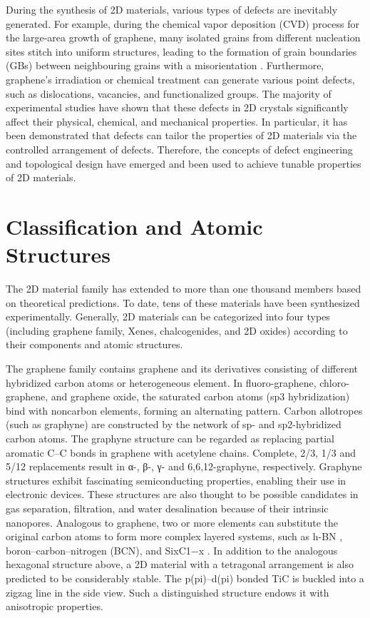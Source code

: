 \documentclass[12pt,a4paper]{report}
\begin{document}
During the synthesis of 2D materials, various types of defects are inevitably generated. For example, during the chemical vapor deposition (CVD) process for the large-area growth of graphene, many isolated grains from different nucleation sites stitch into uniform structures, leading to the formation of grain boundaries (GBs) between neighbouring grains with a misorientation . Furthermore, graphene’s irradiation or chemical treatment can generate various point defects, such as dislocations, vacancies, and functionalized groups. The majority of experimental studies have shown that these defects in 2D crystals significantly affect their physical, chemical, and mechanical properties. In particular, it has been demonstrated that defects can tailor the properties of 2D materials via the controlled arrangement of defects. Therefore, the concepts of defect engineering and topological design have emerged and been used to achieve tunable properties of 2D materials.



\section{Classification and Atomic Structures}

The 2D material family has extended to more than one thousand members based on theoretical predictions. To date, tens of these materials have been synthesized experimentally. Generally, 2D materials can be categorized into four types (including graphene family, Xenes, chalcogenides, and 2D oxides) according to their components and atomic structures.

The graphene family contains graphene and its derivatives consisting of different hybridized carbon atoms or heterogeneous element. In fluoro-graphene, chloro-graphene, and graphene oxide, the saturated carbon atoms (sp3 hybridization) bind with noncarbon elements, forming an alternating pattern. Carbon allotropes (such as graphyne) are constructed by the network of sp- and sp2-hybridized carbon atoms. The graphyne structure can be regarded as replacing partial aromatic C–C bonds in graphene with acetylene chains. Complete, 2/3, 1/3 and 5/12 replacements result in α-, β-, γ- and 6,6,12-graphyne, respectively. Graphyne structures exhibit fascinating semiconducting properties, enabling their use in electronic devices. These structures are also thought to be possible candidates in gas separation, filtration, and water desalination because of their intrinsic nanopores. Analogous to graphene, two or more elements can substitute the original carbon atoms to form more complex layered systems, such as h-BN , boron–carbon–nitrogen (BCN), and SixC1−x . In addition to the analogous hexagonal structure above, a 2D material with a tetragonal arrangement is also predicted to be considerably stable. The p(pi)–d(pi) bonded TiC is buckled into a zigzag line in the side view. Such a distinguished structure endows it with anisotropic properties.
\end{document}
